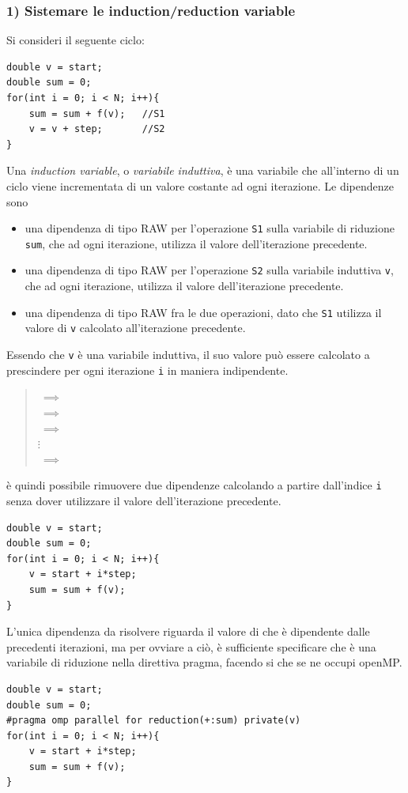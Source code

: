 \documentclass[10pt, letterpaper]{report}
\begin{document}
\subsubsection{1) Sistemare le induction/reduction variable}
Si consideri il seguente ciclo:
\begin{lstlisting}[style=CStyle]
double v = start;
double sum = 0;
for(int i = 0; i < N; i++){
    sum = sum + f(v);   //S1
    v = v + step;       //S2
}
\end{lstlisting}
 Una \textit{induction variable}, o \textit{variabile induttiva}, è una variabile che all'interno di un ciclo viene incrementata di un valore costante ad ogni iterazione.\acc 
Le dipendenze sono\begin{itemize}
    \item una dipendenza di tipo RAW per l'operazione \texttt{S1} sulla variabile di riduzione \texttt{sum}, che ad ogni iterazione, utilizza il valore dell'iterazione precedente. 
    \item una dipendenza di tipo RAW per l'operazione \texttt{S2} sulla variabile induttiva \texttt{v}, che ad ogni iterazione, utilizza il valore dell'iterazione precedente. 
    \item una dipendenza di tipo RAW fra le due operazioni, dato che \texttt{S1} utilizza il valore di \texttt{v} calcolato all'iterazione precedente.
\end{itemize}
Essendo che \texttt{v} è una variabile induttiva, il suo valore può essere calcolato a prescindere per ogni iterazione \texttt{i} in maniera indipendente.\begin{quote}
     $ \ \implies \ $ \\ 
     $ \ \implies \ $ \\ 
     $ \ \implies \ $ \\ 
    $\vdots$ \\ 
     $ \ \implies \ $ \\ 
\end{quote}
è quindi possibile rimuovere due dipendenze calcolando  a partire dall'indice \texttt{i} senza dover utilizzare il valore dell'iterazione precedente.
\begin{lstlisting}[style=CStyle]
double v = start;
double sum = 0;
for(int i = 0; i < N; i++){
    v = start + i*step;       
    sum = sum + f(v);   
}
\end{lstlisting}
L'unica dipendenza da risolvere riguarda il valore di  che è dipendente dalle precedenti iterazioni, ma per ovviare a ciò, è sufficiente specificare che  è una variabile di riduzione nella direttiva pragma, facendo si che se ne occupi openMP.
\begin{lstlisting}[style=CStyle]
double v = start;
double sum = 0;
#pragma omp parallel for reduction(+:sum) private(v)
for(int i = 0; i < N; i++){
    v = start + i*step;       
    sum = sum + f(v);   
}
\end{lstlisting}
\end{document}

